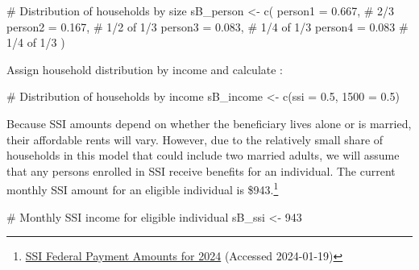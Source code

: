 \documentclass[
  10pt,
  letterpaper,
  DIV=11,
  numbers=noendperiod]{scrartcl}
\newenvironment{Shaded}{\begin{snugshade}}{\end{snugshade}}
\newcommand{\AttributeTok}[1]{\textcolor[rgb]{0.40,0.45,0.13}{#1}}
\newcommand{\CommentTok}[1]{\textcolor[rgb]{0.37,0.37,0.37}{#1}}
\newcommand{\DecValTok}[1]{\textcolor[rgb]{0.68,0.00,0.00}{#1}}
\newcommand{\FloatTok}[1]{\textcolor[rgb]{0.68,0.00,0.00}{#1}}
\newcommand{\FunctionTok}[1]{\textcolor[rgb]{0.28,0.35,0.67}{#1}}
\newcommand{\NormalTok}[1]{\textcolor[rgb]{0.00,0.23,0.31}{#1}}
\newcommand{\OtherTok}[1]{\textcolor[rgb]{0.00,0.23,0.31}{#1}}
\newcommand{\StringTok}[1]{\textcolor[rgb]{0.13,0.47,0.30}{#1}}
\begin{document}
\begin{Shaded}
\begin{Highlighting}[]
\CommentTok{\# Distribution of households by size}
\NormalTok{sB\_person }\OtherTok{\textless{}{-}} \FunctionTok{c}\NormalTok{(}
  \StringTok{\textasciigrave{}}\AttributeTok{person1}\StringTok{\textasciigrave{}} \OtherTok{=} \FloatTok{0.667}\NormalTok{, }\CommentTok{\# 2/3}
  \StringTok{\textasciigrave{}}\AttributeTok{person2}\StringTok{\textasciigrave{}} \OtherTok{=} \FloatTok{0.167}\NormalTok{, }\CommentTok{\# 1/2 of 1/3}
  \StringTok{\textasciigrave{}}\AttributeTok{person3}\StringTok{\textasciigrave{}} \OtherTok{=} \FloatTok{0.083}\NormalTok{, }\CommentTok{\# 1/4 of 1/3}
  \StringTok{\textasciigrave{}}\AttributeTok{person4}\StringTok{\textasciigrave{}} \OtherTok{=} \FloatTok{0.083}  \CommentTok{\# 1/4 of 1/3}
\NormalTok{  )}
\end{Highlighting}
\end{Shaded}

Assign household distribution by income and calculate :

\begin{Shaded}
\begin{Highlighting}[]
\CommentTok{\# Distribution of households by income}
\NormalTok{sB\_income }\OtherTok{\textless{}{-}} \FunctionTok{c}\NormalTok{(}\StringTok{\textasciigrave{}}\AttributeTok{ssi}\StringTok{\textasciigrave{}} \OtherTok{=} \FloatTok{0.5}\NormalTok{, }\StringTok{\textasciigrave{}}\AttributeTok{1500}\StringTok{\textasciigrave{}} \OtherTok{=} \FloatTok{0.5}\NormalTok{)}
\end{Highlighting}
\end{Shaded}

Because SSI amounts depend on whether the beneficiary lives alone or is
married, their affordable rents will vary. However, due to the
relatively small share of households in this model that could include
two married adults, we will assume that any persons enrolled in SSI
receive benefits for an individual. The current monthly SSI amount for
an eligible individual is \$943.\footnote{\href{https://www.ssa.gov/oact/cola/SSI.html}{SSI
  Federal Payment Amounts for 2024} (Accessed 2024-01-19)}

\begin{Shaded}
\begin{Highlighting}[]
\CommentTok{\# Monthly SSI income for eligible individual}
\NormalTok{sB\_ssi }\OtherTok{\textless{}{-}} \DecValTok{943}
\end{Highlighting}
\end{Shaded}
\end{document}
